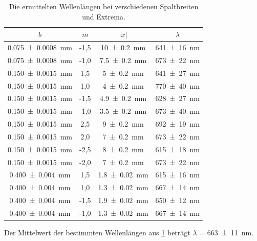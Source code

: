 \documentclass[
	a4paper,
	12pt,
	pagesize,
	ngerman
]{scrartcl}
\begin{document}
	\begin{table}[H]
		\centering
		\begin{tabular}{ c | c | c | c }
			$b$ & $m$ &  $|x|$ & $\lambda$ \\ \hline
			\SI{0,075 +- 0,0008}{mm} & -1,5 & \SI{10 +- 0,2}{mm} & \SI{641 +- 16}{nm} \\
			\SI{0,075+- 0,0008}{mm} & -1,0 & \SI{7,5 +- 0,2}{mm} & \SI{673+-22}{nm} \\
			
			\SI{0,150+- 0,0015}{mm} & 1,5 & \SI{5 +- 0,2}{mm} & \SI{641+-27}{nm} \\
			\SI{0,150+- 0,0015}{mm} & 1,0 & \SI{4 +- 0,2}{mm} & \SI{770+-40}{nm} \\
			\SI{0,150+- 0,0015}{mm} & -1,5 & \SI{4,9 +- 0,2}{mm} & \SI{628+-27}{nm} \\
			\SI{0,150+- 0,0015}{mm} & -1,0 & \SI{3,5 +- 0,2}{mm} & \SI{673+-40}{nm} \\
			
			\SI{0,150+- 0,0015}{mm} & 2,5 & \SI{9 +- 0,2}{mm} & \SI{692+-19}{nm} \\
			\SI{0,150+- 0,0015}{mm} & 2,0 & \SI{7 +- 0,2}{mm} & \SI{673+-22}{nm} \\
			\SI{0,150+- 0,0015}{mm} & -2,5 & \SI{8 +- 0,2}{mm} & \SI{615+-18}{nm} \\
			\SI{0,150+- 0,0015}{mm} & -2,0 & \SI{7 +- 0,2}{mm} & \SI{673+-22}{nm} \\
			
			\SI{0,400+- 0,004}{mm} & 1,5 & \SI{1,8 +- 0,02}{mm} & \SI{615+-16}{nm} \\
			\SI{0,400+- 0,004}{mm} & 1,0 & \SI{1,3 +- 0,02}{mm} & \SI{667+-14}{nm} \\
			\SI{0,400+- 0,004}{mm} & -1,5 & \SI{1,9 +- 0,02}{mm} & \SI{650+-12}{nm} \\
			\SI{0,400+- 0,004}{mm} & -1,0 & \SI{1,3 +- 0,02}{mm} & \SI{667+-14}{nm} \\
		\end{tabular}
		\caption{Die ermittelten Wellenlängen bei verschiedenen Spaltbreiten und Extrema.}
		\label{Einzelspalte} 
	\end{table}
	Der Mittelwert der bestimmten Wellenlängen aus \cref{Einzelspalte} beträgt $\bar{\lambda}$ = \SI{663 +- 11}{nm}.
\end{document}
